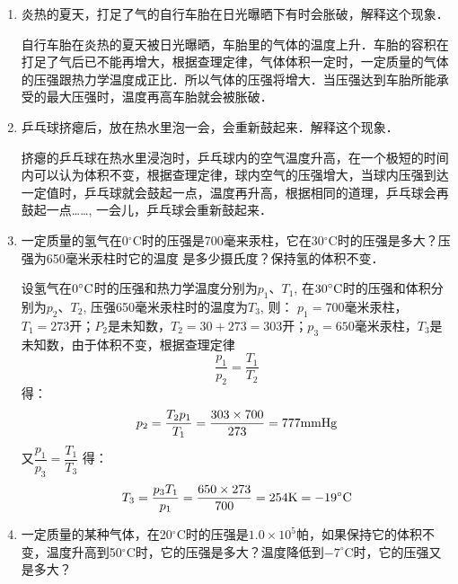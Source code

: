 \begin{enumerate}
	\item 炎热的夏天，打足了气的自行车胎在日光曝晒下有时会胀破，解释这个现象．

\begin{solution}
  自行车胎在炎热的夏天被日光曝晒，车胎里的气体的温度上升．车胎的容积在打足了气后已不能再增大，根据查理定律，气体体积一定时，一定质量的气体的压强跟热力学温度成正比．所以气体的压强将增大．当压强达到车胎所能承受的最大压强时，温度再高车胎就会被胀破．
\end{solution}
\item 乒乓球挤瘪后，放在热水里泡一会，会重新鼓起来．解释这个现象．

\begin{solution}
    挤瘪的乒乓球在热水里浸泡时，乒乓球内的空气温度升高，在一个极短的时间内可以认为体积不变，根据查理定律，球内空气的压强增大，当球内压强到达一定值时，乒乓球就会鼓起一点，温度再升高，根据相同的道理，乒乓球会再鼓起一点……, 一会儿，乒乓球会重新鼓起来．
\end{solution}
\item 一定质量的氢气在0$^\circ$C时的压强是700毫来汞柱，它在30$^\circ$C时的压强是多大？压强为650毫米汞柱时它的温度
是多少摄氏度？保持氢的体积不变．

\begin{solution}
设氢气在$0^{\circ}{\rm C}$时的压强和热力学温度分别为$p_1$、$T_1$, 在$30^{\circ}{\rm C}$时的压强和体积分别为$p_2$、$T_2$, 压强650毫米汞柱时的温度为$T_3$, 则：
$p_1=$700毫米汞柱，$T_1=273$开；$P_2$是未知数，$T_2=30+273=303$开；$p_3=650$毫米汞柱，$T_3$是未知数，由于体积不变，根据查理定律
\[\frac{p_1}{p_2}=\frac{T_1}{T_2}\]
得：
\[p_2=\frac{T_2p_1}{T_1}=\frac{303\times 700}{273}=777{\rm mmHg}\]
又$\dfrac{p_1}{p_3}=\dfrac{T_1}{T_3}$
得：
\[T_3=\frac{p_3T_1}{p_1}=\frac{650\times 273}{700}=254{\rm K}=-19^{\circ}{\rm C}\]
\end{solution}
\item 一定质量的某种气体，在20$^\circ$C时的压强是$1.0\times 10^5$帕，如果保持它的体积不变，温度升高到50$^\circ$C时，它的压强是多大？温度降低到$-7^\circ$C时，它的压强又是多大？


\end{enumerate}
